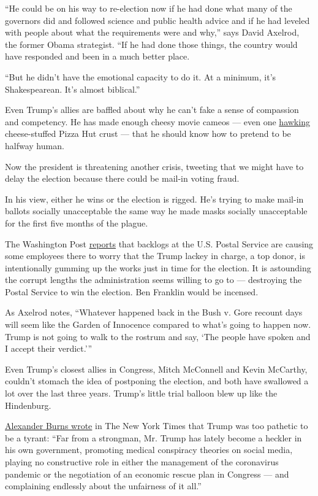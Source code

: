 ``He could be on his way to re-election now if he had done what many of
the governors did and followed science and public health advice and if
he had leveled with people about what the requirements were and why,''
says David Axelrod, the former Obama strategist. ``If he had done those
things, the country would have responded and been in a much better
place.

``But he didn't have the emotional capacity to do it. At a minimum, it's
Shakespearean. It's almost biblical.''

Even Trump's allies are baffled about why he can't fake a sense of
compassion and competency. He has made enough cheesy movie cameos ---
even one \href{https://www.youtube.com/watch?v=QVmAcULPMu4}{hawking}
cheese-stuffed Pizza Hut crust --- that he should know how to pretend to
be halfway human.

Now the president is threatening another crisis, tweeting that we might
have to delay the election because there could be mail-in voting fraud.

In his view, either he wins or the election is rigged. He's trying to
make mail-in ballots socially unacceptable the same way he made masks
socially unacceptable for the first five months of the plague.

The Washington Post
\href{https://www.washingtonpost.com/politics/postal-service-backlog-sparks-worries-that-ballot-delivery-could-be-delayed-in-november/2020/07/30/cb19f1f4-d1d0-11ea-8d32-1ebf4e9d8e0d_story.html}{reports}
that backlogs at the U.S. Postal Service are causing some employees
there to worry that the Trump lackey in charge, a top donor, is
intentionally gumming up the works just in time for the election. It is
astounding the corrupt lengths the administration seems willing to go to
--- destroying the Postal Service to win the election. Ben Franklin
would be incensed.

As Axelrod notes, ``Whatever happened back in the Bush v. Gore recount
days will seem like the Garden of Innocence compared to what's going to
happen now. Trump is not going to walk to the rostrum and say, `The
people have spoken and I accept their verdict.'''

Even Trump's closest allies in Congress, Mitch McConnell and Kevin
McCarthy, couldn't stomach the idea of postponing the election, and both
have swallowed a lot over the last three years. Trump's little trial
balloon blew up like the Hindenburg.

\href{https://www.nytimes3xbfgragh.onion/2020/07/30/us/politics/trump-delay-election.html}{Alexander
Burns wrote} in The New York Times that Trump was too pathetic to be a
tyrant: ``Far from a strongman, Mr. Trump has lately become a heckler in
his own government, promoting medical conspiracy theories on social
media, playing no constructive role in either the management of the
coronavirus pandemic or the negotiation of an economic rescue plan in
Congress --- and complaining endlessly about the unfairness of it all.''

